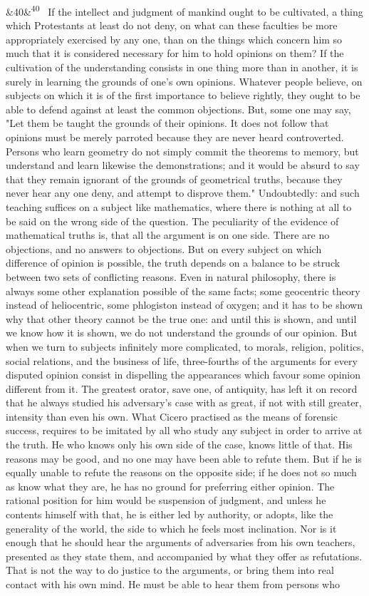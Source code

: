 \documentclass[12pt]{article}
\newcommand{\para}[1][]{\par\noindent\ifx&#1&\else\textsuperscript{\footnotesize #1}~\fi}
\begin{document}
\para[40] If the intellect and judgment of mankind ought to be cultivated, a thing which Protestants at least do not deny, on what can these faculties be more appropriately exercised by any one, than on the things which concern him so much that it is considered necessary for him to hold opinions on them? If the cultivation of the understanding consists in one thing more than in another, it is surely in learning the grounds of one's own opinions. Whatever people believe, on subjects on which it is of the first importance to believe rightly, they ought to be able to defend against at least the common objections. But, some one may say, "Let them be taught the grounds of their opinions. It does not follow that opinions must be merely parroted because they are never heard controverted. Persons who learn geometry do not simply commit the theorems to memory, but understand and learn likewise the demonstrations; and it would be absurd to say that they remain ignorant of the grounds of geometrical truths, because they never hear any one deny, and attempt to disprove them." Undoubtedly: and such teaching suffices on a subject like mathematics, where there is nothing at all to be said on the wrong side of the question. The peculiarity of the evidence of mathematical truths is, that all the argument is on one side. There are no objections, and no answers to objections. But on every subject on which difference of opinion is possible, the truth depends on a balance to be struck between two sets of conflicting reasons. Even in natural philosophy, there is always some other explanation possible of the same facts; some geocentric theory instead of heliocentric, some phlogiston instead of oxygen; and it has to be shown why that other theory cannot be the true one: and until this is shown, and until we know how it is shown, we do not understand the grounds of our opinion. But when we turn to subjects infinitely more complicated, to morals, religion, politics, social relations, and the business of life, three-fourths of the arguments for every disputed opinion consist in dispelling the appearances which favour some opinion different from it. The greatest orator, save one, of antiquity, has left it on record that he always studied his adversary's case with as great, if not with still greater, intensity than even his own. What Cicero practised as the means of forensic success, requires to be imitated by all who study any subject in order to arrive at the truth. He who knows only his own side of the case, knows little of that. His reasons may be good, and no one may have been able to refute them. But if he is equally unable to refute the reasons on the opposite side; if he does not so much as know what they are, he has no ground for preferring either opinion. The rational position for him would be suspension of judgment, and unless he contents himself with that, he is either led by authority, or adopts, like the generality of the world, the side to which he feels most inclination. Nor is it enough that he should hear the arguments of adversaries from his own teachers, presented as they state them, and accompanied by what they offer as refutations. That is not the way to do justice to the arguments, or bring them into real contact with his own mind. He must be able to hear them from persons who 
\end{document}
